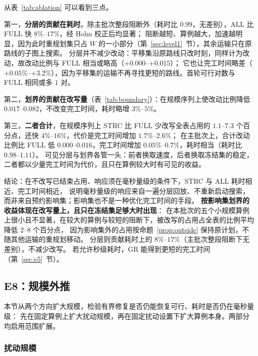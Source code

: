\documentclass[manuscript,screen,review]{acmart}
\providecommand{\STRC}{\textsc{STRC}}
\begin{document}
从表~\ref{tab:ablation} 可以看到三点。

第一，\textbf{分层的贡献在耗时}。除主批次整段阻断外（耗时比 \(0.99\)，无差别），ALL 比 FULL 快 \(8\%\)--\(17\%\)，经 Holm 校正后均显著；
阻断越短、算例越大，加速越明显，因为此时重规划集只占 \(W\) 的一小部分（第~\ref{sec:level1}~节），其余运输只在原路线的子图上搜索。
分层并不减少改动：平移集沿原路线只改时刻，同样计为改动，故改动比例与 FULL 相当或略高（\(+0.000\)--\(+0.015\)）；
它也让完工时间略差（\(+0.05\%\)--\(+3.2\%\)），因为平移集的运输不再寻找更短的路线。首轮可行对数与 FULL 相同或多 \(1\) 对。

第二，\textbf{划界的贡献在改写量}（表~\ref{tab:boundary}）：在规模序列上使改动比例降低 \(0.017\)--\(0.082\)，不改变完工时间，耗时略增 \(3\%\)--\(5\%\)。

第三，\textbf{二者合计}，在规模序列上 \STRC{} 比 FULL 少改写全表占用的 \(1.1\)--\(7.3\) 个百分点，还快 \(4\%\)--\(16\%\)，代价是完工时间增加 \(1.7\%\)--\(2.6\%\)；
在主批次上，合计改动比例比 FULL 低 \(0.000\)--\(0.016\)，完工时间增加 \(0.05\%\)--\(0.7\%\)，耗时相当（耗时比 \(0.98\)--\(1.11\)）。
可见分层与划界各管一头：前者换取速度，后者换取冻结集的稳定，二者都以少量完工时间为代价，且只在算例较大时有可见的收益。

结论：在不改写已结束占用、响应须在毫秒量级的条件下，\STRC{} 与 ALL 耗时相近、完工时间相近，
说明毫秒量级的响应来自一遍分层回放、不重新启动搜索，而非来自预约影响集；影响集也不是一种优化完工时间的手段。
\textbf{按影响集划界的收益体现在改写量上，且只在冻结集足够大时出现}：
在本批次的五个小规模算例上很小且不显著，在较大的算例与较短的阻断下，被改写的占用占全表的比例平均降低 \(2\)--\(8\) 个百分点，
因为影响集外的占用按命题~\ref{prop:outside} 保持原计划，不随其他运输的重规划移动。
分层则贡献耗时上的 \(8\%\)--\(17\%\)（主批次整段阻断下无差别），不减少改写。
若允许秒级耗时，GR 能得到更短的完工时间（第~\ref{sec:e5}~节）。

\subsection{E8：规模外推}
\label{sec:e8}

本节从两个方向扩大规模，检验有界修复是否仍能恢复可行、耗时是否仍在毫秒量级：
先在固定算例上扩大扰动规模，再在固定扰动设置下扩大算例本身。两部分均启用范围扩展。

\subsubsection{扰动规模}
\label{sec:scale}
\end{document}
